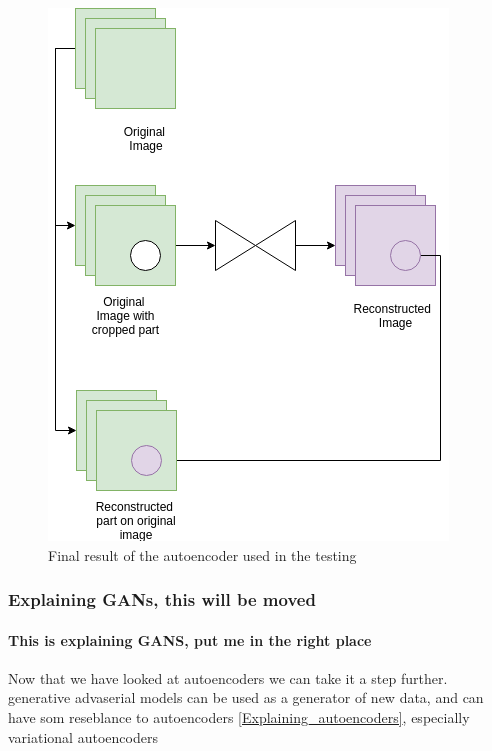 	
	\begin{figure}[ht!]
	    \centering
	    \includegraphics[scale=0.5]{background/figures/AE_for_inpainting.png}
	    \caption{Final result of the autoencoder used in the testing}
	\end{figure}
	
	
	
	
	
      \subsubsection{Explaining GANs, this will be moved}
      	\paragraph{This is explaining GANS, put me in the right place} %
	  Now that we have looked at autoencoders we can take it a step further. 
	  generative advaserial models can be used as a generator of new data, and can have som reseblance to autoencoders \ref{Explaining_autoencoders}, especially variational autoencoders %
	  
